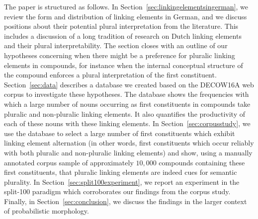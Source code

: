 The paper is structured as follows.
In Section~\ref{sec:linkingelementsingerman}, we review the form and distribution of linking elements in German, and we discuss positions about their potential plural interpretation from the literature.
This includes a discussion of a long tradition of research on Dutch linking elements and their plural interpretability.
The section closes with an outline of our hypotheses concerning when there might be a preference for pluralic linking elements in compounds, for instance when the internal conceptual structure of the compound enforces a plural interpretation of the first constituent.
Section~\ref{sec:data} describes a database we created based on the DECOW16A web corpus to investigate these hypotheses.
The database shows the frequencies with which a large number of nouns occurring as first constituents in compounds take pluralic and non-pluralic linking elements.
It also quantifies the productivity of each of these nouns with these linking elements.
In Section~\ref{sec:corpusstudy}, we use the database to select a large number of first constituents which exhibit linking element alternation (in other words, first constituents which occur reliably with both pluralic and non-pluralic linking elements) and show, using a manually annotated corpus sample of approximately $10,000$ compounds containing these first constituents, that pluralic linking elements are indeed cues for semantic plurality.
In Section~\ref{sec:split100experiment}, we report an experiment in the split-100 paradigm which corroborates our findings from the corpus study.
Finally, in Section~\ref{sec:conclusion}, we discuss the findings in the larger context of probabilistic morphology.
